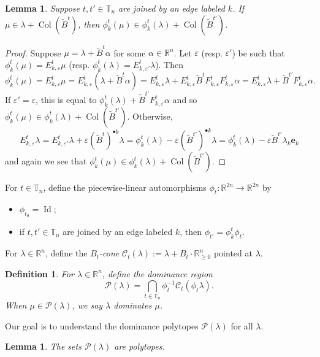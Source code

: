 \documentclass{amsart}
\newtheorem{definition}[theorem]{Definition}
\newtheorem{lemma}[theorem]{Lemma}
\numberwithin{theorem}{section}
\newcommand{\cC}{\mathcal{C}}
\newcommand{\cP}{\mathcal{P}}
\newcommand{\RR}{\mathbb{R}}
\newcommand{\TT}{\mathbb{T}}
\newcommand{\Col}{\operatorname{Col}}
\newcommand{\Id}{\operatorname{Id}}
\begin{document}
  \begin{lemma}
    Suppose $t,t'\in\TT_n$ are joined by an edge labeled $k$.
    If $\mu\in\lambda+\Col(\tilde{B}^t)$, then $\phi^t_k(\mu)\in\phi^t_k(\lambda)+\Col(\tilde{B}^{t'})$.
  \end{lemma}
  \begin{proof}
    Suppose $\mu=\lambda+\tilde{B}^t\alpha$ for some $\alpha\in\RR^n$.
    Let $\varepsilon$ (resp. $\varepsilon'$) be such that $\phi^t_k(\mu)=E^t_{k,\varepsilon}\mu$ (resp. $\phi^t_k(\lambda)=E^t_{k,\varepsilon'}\lambda$).
    Then 
    \[
      \phi^t_k(\mu)=E^t_{k,\varepsilon}\mu=E^t_{k,\varepsilon}(\lambda+\tilde{B}^t\alpha)=E^t_{k,\varepsilon}\lambda + E^t_{k,\varepsilon} \tilde{B}^t F^t_{k,\varepsilon} F^t_{k,\varepsilon}\alpha=E^t_{k,\varepsilon}\lambda + \tilde{B}^{t'} F^t_{k,\varepsilon}\alpha.
    \]
    If $\varepsilon'=\varepsilon$, this is equal to $\phi^t_k(\lambda) + \tilde{B}^{t'} F^t_{k,\varepsilon}\alpha$ and so $\phi^t_k(\mu)\in\phi^t_k(\lambda)+\Col(\tilde{B}^{t'})$.
    Otherwise, 
    \[
      E^t_{k,\varepsilon}\lambda=E^t_{k,\varepsilon'}\lambda+\varepsilon(\tilde{B}^t)^{\bullet k}\lambda=\phi^t_k(\lambda)-\varepsilon(\tilde{B}^{t'})^{\bullet k}\lambda=\phi^t_k(\lambda)-\varepsilon \tilde{B}^{t'} \lambda_k \mathbf{e}_k
    \]
    and again we see that $\phi^t_k(\mu)\in\phi^t_k(\lambda)+\Col(\tilde{B}^{t'})$.
  \end{proof}

  For $t\in\TT_n$, define the piecewise-linear automorphisms $\phi_t:\RR^{2n}\to\RR^{2n}$ by
  \begin{itemize}
    \item $\phi_{t_0}=\Id$;
    \item if $t,t'\in\TT_n$ are joined by an edge labeled $k$, then $\phi_{t'}=\phi^t_k \phi_t$.
  \end{itemize}

  
  For $\lambda\in\RR^n$, define the \emph{$B_t$-cone} $\cC_t(\lambda):=\lambda+B_t\cdot\RR_{\ge0}^n$ pointed at $\lambda$.
  \begin{definition}
    For $\lambda\in\RR^n$, define the \emph{dominance region} 
    \[
      \cP(\lambda) = \bigcap_{t\in\TT_n} \phi_t^{-1} \cC_t(\phi_t \lambda).
    \]
    When $\mu\in\cP(\lambda)$, we say \emph{$\lambda$ dominates $\mu$}.
  \end{definition}
  Our goal is to understand the dominance polytopes $\cP(\lambda)$ for all $\lambda$.
  \begin{lemma}
    The sets $\cP(\lambda)$ are polytopes.
  \end{lemma}
\end{document}
